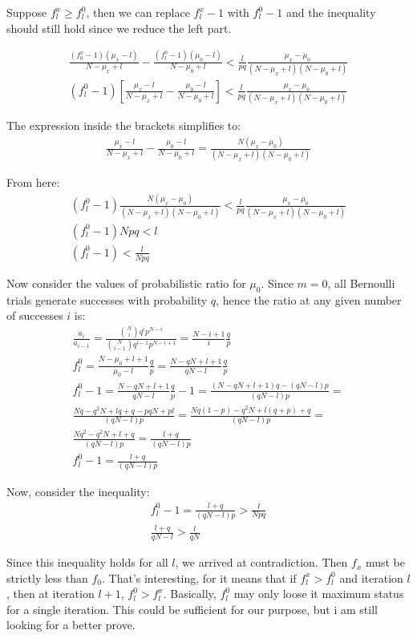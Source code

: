 \documentclass[11pt,draft]{article}
\begin{document}
Suppose $f^x_l \ge f^0_l$, then we can replace $f^x_l - 1$ with $f^0_l - 1$ and the inequality should still hold since we reduce the left part.

\begin{align}
\frac{(f^x_0 - 1)(\mu_x - l)}{N-\mu_x + l}  - \frac{(f^0_l - 1)(\mu_0 - l)}{N-\mu_0 + l} < \frac{l}{pq} \frac{\mu_x - \mu_0}{(N-\mu_x + l)(N-\mu_0 + l)} \\
(f^0_l - 1) \left [ \frac{\mu_x - l}{N-\mu_x + l}  - \frac{\mu_0 - l}{N-\mu_0 + l} \right ] < \frac{l}{pq} \frac{\mu_x - \mu_0}{(N-\mu_x + l)(N-\mu_0 + l)}
\end{align}

The expression inside the brackets simplifies to:
\begin{align}
\frac{\mu_x - l}{N-\mu_x + l}  - \frac{\mu_0 - l}{N-\mu_0 + l} = \frac{N(\mu_x-\mu_0)}{(N-\mu_x + l)(N-\mu_0 + l)}
\end{align}

From here:
\begin{align}
(f^0_l - 1) \frac{N(\mu_x-\mu_0)}{(N-\mu_x + l)(N-\mu_0 + l)} < \frac{l}{pq} \frac{\mu_x - \mu_0}{(N-\mu_x + l)(N-\mu_0 + l)} \\
(f^0_l - 1)Npq < l \\
(f^0_l - 1) < \frac{l}{Npq}
\end{align}

Now consider the values of probabilistic ratio for $\mu_0$.  Since $m=0$, all Bernoulli trials generate successes with probability $q$, hence the ratio at any given number of successes $i$ is:
\begin{align}
\frac{a_i}{a_{i-1}} = \frac{\binom{N}{i} q^ip^{N-i}}{\binom{N}{i-1} q^{i-1}p^{N-i+1}} = \frac{N-i+1}{i}\frac{q}{p} \\
f^0_l = \frac{N-\mu_0 + l+1}{\mu_0 - l}\frac{q}{p} = \frac{N- qN+ l+1}{qN - l}\frac{q}{p}  \\
f^0_l  - 1 =  \frac{N- qN+ l+1}{qN - l}\frac{q}{p} - 1 = \frac{(N- qN+ l+1)q - (qN-l)p}{(qN-l)p} = \\
\frac{Nq -q^2N +lq+q - pqN +pl}{(qN-l)p} = \frac{Nq(1-p) -q^2N +l(q+p)+q}{(qN-l)p} = \\
 \frac{Nq^2 -q^2N +l+q}{(qN-l)p} = \frac{l+q}{(qN-l)p}  \\
 f^0_l  - 1 =  \frac{l+q}{(qN-l)p}
\end{align}

Now, consider the inequality:
\begin{align}
 f^0_l  - 1 =  \frac{l+q}{(qN-l)p} >  \frac{l}{Npq} \\
 \frac{l+q}{qN-l} >  \frac{l}{qN} 
\end{align}

Since this inequality holds for all $l$, we arrived at contradiction.   Then $f_x$ must be strictly less than $f_0$.   
That's interesting, for it means that if  $f^x_l > f^0_l$ and iteration $l$, then at iteration $l+1$,     $f^0_l > f^x_l$.
Basically, $f^0_l$ may only loose it maximum status for a single iteration.
This could be sufficient for our purpose, but i am still looking for a better prove. 
 
\end{document}
